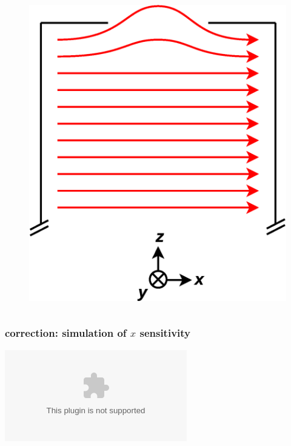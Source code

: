 \documentclass{beamer}
\newcommand{\pyplot}{\includegraphics[width=\textwidth, trim=60px 60px 60px 40px]}
\begin{document}
\begin{frame}
\begin{columns}[b]
    \begin{column}{0.5\textwidth}
    \begin{figure}
    \includegraphics[width=\textwidth]
    {figures/field_endcap.eps}
    \end{figure}
    \vspace{0pt}
    \end{column}
    
\end{columns}

\end{frame}

\begin{frame}
\frametitle{correction: simulation of $x$ sensitivity}

    \begin{center}
    \pyplot{../savedplots/manyx_Bz_z.eps}
    \end{center}

\end{frame}
\end{document}
